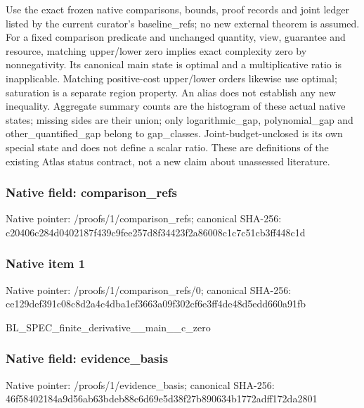 \documentclass[10pt,a4paper]{article}
\begin{document}
\begingroup\raggedright\sloppy Use the exact frozen native comparisons,\allowbreak{} bounds,\allowbreak{} proof records and joint ledger listed by the current curator's baseline\_\allowbreak{}refs;\allowbreak{} no new external theorem is assumed. For a fixed comparison predicate and unchanged quantity,\allowbreak{} view,\allowbreak{} guarantee and resource,\allowbreak{} matching upper/\allowbreak{}lower zero implies exact complexity zero by nonnegativity. Its canonical main state is optimal and a multiplicative ratio is inapplicable. Matching positive-cost upper/\allowbreak{}lower orders likewise use optimal;\allowbreak{} saturation is a separate region property. An alias does not establish any new inequality. Aggregate summary counts are the histogram of these actual native states;\allowbreak{} missing sides are their union;\allowbreak{} only logarithmic\_\allowbreak{}gap,\allowbreak{} polynomial\_\allowbreak{}gap and other\_\allowbreak{}quantified\_\allowbreak{}gap belong to gap\_\allowbreak{}classes. Joint-budget-unclosed is its own special state and does not define a scalar ratio. These are definitions of the existing Atlas status contract,\allowbreak{} not a new claim about unassessed literature. \par\endgroup

\subsubsection{Native field: comparison\_\allowbreak{}refs}
Native pointer: /proofs/1/comparison\_\allowbreak{}refs; canonical SHA-256: c20406c284d0402187f439c9fee257d8f34423f2a86008c1c7c51cb3ff448c1d

\subsubsection{Native item 1}
Native pointer: /proofs/1/comparison\_\allowbreak{}refs/0; canonical SHA-256: ce129def391c08c8d2a4c4dba1ef3663a09f302cf6e3ff4de48d5edd660a91fb

\begingroup\raggedright\sloppy BL\_\allowbreak{}SPEC\_\allowbreak{}finite\_\allowbreak{}derivative\_\allowbreak{}\_\allowbreak{}main\_\allowbreak{}\_\allowbreak{}c\_\allowbreak{}zero\par\endgroup

\subsubsection{Native field: evidence\_\allowbreak{}basis}
Native pointer: /proofs/1/evidence\_\allowbreak{}basis; canonical SHA-256: 46f58402184a9d56ab63bdeb88c6d69e5d38f27b890634b1772adff172da2801
\end{document}

